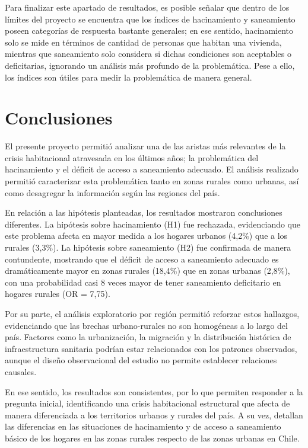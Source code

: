 \documentclass[
  spanish,
  a4paper,
  oneside]{scrbook}
\begin{document}
Para finalizar este apartado de resultados, es posible señalar que
dentro de los límites del proyecto se encuentra que los índices de
hacinamiento y saneamiento poseen categorías de respuesta bastante
generales; en ese sentido, hacinamiento solo se mide en términos de
cantidad de personas que habitan una vivienda, mientras que saneamiento
solo considera si dichas condiciones son aceptables o deficitarias,
ignorando un análisis más profundo de la problemática. Pese a ello, los
índices son útiles para medir la problemática de manera general.


\chapter{Conclusiones}\label{conclusiones}

El presente proyecto permitió analizar una de las aristas más relevantes
de la crisis habitacional atravesada en los últimos años; la
problemática del hacinamiento y el déficit de acceso a saneamiento
adecuado. El análisis realizado permitió caracterizar esta problemática
tanto en zonas rurales como urbanas, así como desagregar la información
según las regiones del país.

En relación a las hipótesis planteadas, los resultados mostraron
conclusiones diferentes. La hipótesis sobre hacinamiento (H1) fue
rechazada, evidenciando que este problema afecta en mayor medida a los
hogares urbanos (4,2\%) que a los rurales (3,3\%). La hipótesis sobre
saneamiento (H2) fue confirmada de manera contundente, mostrando que el
déficit de acceso a saneamiento adecuado es dramáticamente mayor en
zonas rurales (18,4\%) que en zonas urbanas (2,8\%), con una
probabilidad casi 8 veces mayor de tener saneamiento deficitario en
hogares rurales (OR = 7,75).

Por su parte, el análisis exploratorio por región permitió reforzar
estos hallazgos, evidenciando que las brechas urbano-rurales no son
homogéneas a lo largo del país. Factores como la urbanización, la
migración y la distribución histórica de infraestructura sanitaria
podrían estar relacionados con los patrones observados, aunque el diseño
observacional del estudio no permite establecer relaciones causales.

En ese sentido, los resultados son consistentes, por lo que permiten
responder a la pregunta inicial, identificando una crisis habitacional
estructural que afecta de manera diferenciada a los territorios urbanos
y rurales del país. A su vez, detallan las diferencias en las
situaciones de hacinamiento y de acceso a saneamiento básico de los
hogares en las zonas rurales respecto de las zonas urbanas en Chile.
\end{document}
